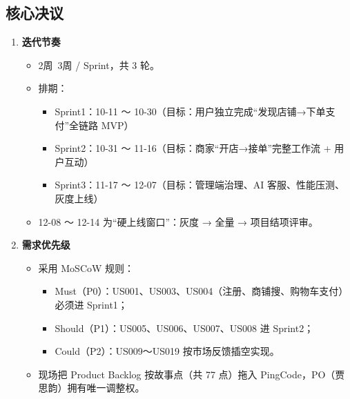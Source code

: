 \subsection{核心决议}

\begin{enumerate}
    \item \textbf{迭代节奏}
          \begin{itemize}
              \item 2周~3周 / Sprint，共 3 轮。
              \item 排期：
                    \begin{itemize}
                        \item Sprint1：10-11 ～ 10-30（目标：用户独立完成“发现店铺→下单支付”全链路 MVP）
                        \item Sprint2：10-31 ～ 11-16（目标：商家“开店→接单”完整工作流 + 用户互动）
                        \item Sprint3：11-17 ～ 12-07（目标：管理端治理、AI 客服、性能压测、灰度上线）
                    \end{itemize}
              \item 12-08 ～ 12-14 为“硬上线窗口”：灰度 → 全量 → 项目结项评审。
          \end{itemize}



    \item \textbf{需求优先级}
          \begin{itemize}
              \item 采用 MoSCoW 规则：
                    \begin{itemize}
                        \item Must（P0）：US001、US003、US004（注册、商铺搜、购物车支付）必须进 Sprint1；
                        \item Should（P1）：US005、US006、US007、US008 进 Sprint2；
                        \item Could（P2）：US009～US019 按市场反馈插空实现。
                    \end{itemize}
              \item 现场把 Product Backlog 按故事点（共 77 点）拖入 PingCode，PO（贾思韵）拥有唯一调整权。
          \end{itemize}




\end{enumerate}

